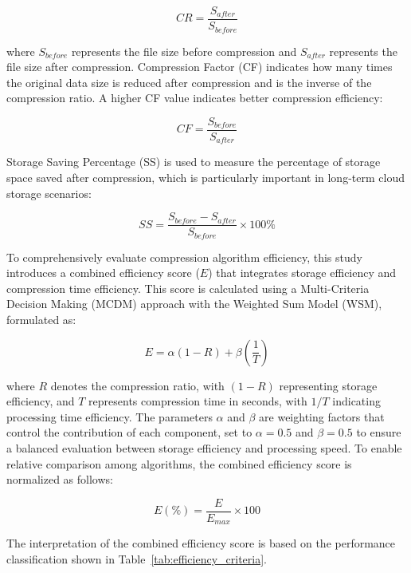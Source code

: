 \documentclass{iaesarticle}
\begin{document}
\begin{equation}
CR = \frac{S_{after}}{S_{before}}
\end{equation}

where $S_{before}$ represents the file size before compression and $S_{after}$ represents the file size after compression. Compression Factor (CF) indicates how many times the original data size is reduced after compression and is the inverse of the compression ratio. A higher CF value indicates better compression efficiency:

\begin{equation}
CF = \frac{S_{before}}{S_{after}}
\end{equation}

Storage Saving Percentage (SS) is used to measure the percentage of storage space saved after compression, which is particularly important in long-term cloud storage scenarios:

\begin{equation}
SS = \frac{S_{before} - S_{after}}{S_{before}} \times 100\%
\end{equation}

To comprehensively evaluate compression algorithm efficiency, this study introduces a combined efficiency score ($E$) that integrates storage efficiency and compression time efficiency. This score is calculated using a Multi-Criteria Decision Making (MCDM) approach with the Weighted Sum Model (WSM), formulated as:

\begin{equation}
E = \alpha (1 - R) + \beta \left( \frac{1}{T} \right)
\end{equation}

where $R$ denotes the compression ratio, with $(1-R)$ representing storage efficiency, and $T$ represents compression time in seconds, with $1/T$ indicating processing time efficiency. The parameters $\alpha$ and $\beta$ are weighting factors that control the contribution of each component, set to $\alpha = 0.5$ and $\beta = 0.5$ to ensure a balanced evaluation between storage efficiency and processing speed. To enable relative comparison among algorithms, the combined efficiency score is normalized as follows:

\begin{equation}
E(\%) = \frac{E}{E_{max}} \times 100
\end{equation}

The interpretation of the combined efficiency score is based on the performance classification shown in Table~\ref{tab:efficiency_criteria}.
\end{document}
